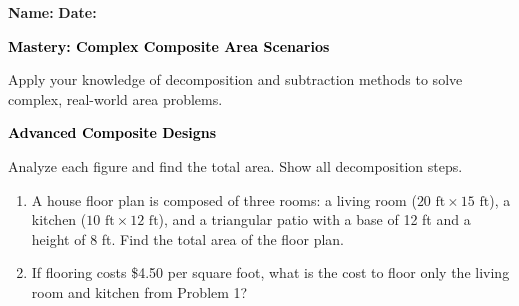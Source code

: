 \documentclass[12pt, letterpaper, fleqn]{article}
\begin{document}
\textbf{Name:} \underline{\hspace{5cm}}
\hfill
\textbf{Date:} \underline{\hspace{3cm}}\\

\begin{tcolorbox}[colback=black!10]
    \large\textcolor{black}{\textbf{Mastery: Complex Composite Area Scenarios}}
\end{tcolorbox}

\vspace{3mm}

\noindent
Apply your knowledge of decomposition and subtraction methods to solve complex, real-world area problems.

\vspace{4mm}

\begin{tcolorbox}[colback=black!10]
\large\textcolor{black}{\textbf{Advanced Composite Designs}}
\end{tcolorbox}

\noindent
Analyze each figure and find the total area. Show all decomposition steps.

\vspace{3mm}

\begin{enumerate}[itemsep=4cm, leftmargin=0.6cm]

\item A house floor plan is composed of three rooms: a living room ($20\text{ ft} \times 15\text{ ft}$), a kitchen ($10\text{ ft} \times 12\text{ ft}$), and a triangular patio with a base of 12 ft and a height of 8 ft. Find the total area of the floor plan.

\vspace{2cm}

\item If flooring costs \$4.50 per square foot, what is the cost to floor only the living room and kitchen from Problem 1?

\vspace{2cm}



\end{enumerate}
\end{document}
